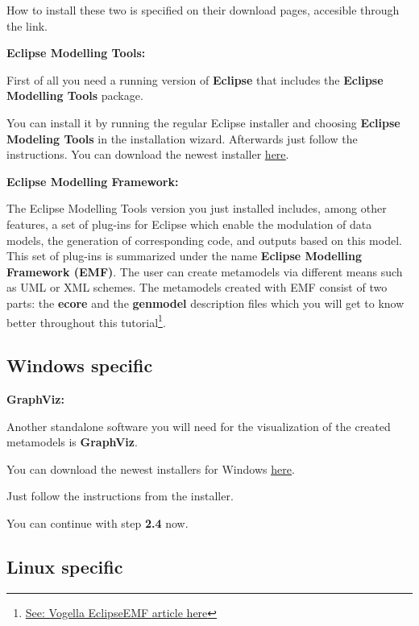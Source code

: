 How to install these two is specified on their download pages, accesible through the link.\newline

\textbf{Eclipse Modelling Tools:}

First of all you need a running version of \textbf{Eclipse} that includes the \textbf{Eclipse Modelling Tools} package.

You can install it by running the regular Eclipse installer and choosing \textbf{Eclipse Modeling Tools} in the installation wizard. Afterwards just follow the instructions.\newline
You can download the newest installer \underline{\href{https://www.eclipse.org/downloads/}{here}}.\newline

\textbf{Eclipse Modelling Framework:}

The Eclipse Modelling Tools version you just installed includes, among other features, a set of plug-ins for Eclipse which enable the modulation of data models, the generation of corresponding code, and outputs based on this model.\newline
This set of plug-ins is summarized under the name \textbf{Eclipse Modelling Framework (EMF)}.\newline
The user can create metamodels via different means such as UML or XML schemes. The metamodels created with EMF consist of two parts: the \textbf{ecore} and the \textbf{genmodel} description files which you will get to know better throughout this tutorial\footnote{\href{https://www.vogella.com/tutorials/EclipseEMF/article.html}{See: Vogella EclipseEMF article \underline{here}}}.

\subsection{Windows specific}

\textbf{GraphViz:}

Another standalone software you will need for the visualization of the created metamodels is \textbf{GraphViz}.

You can download the newest installers for Windows \href{https://graphviz.org/download/}{\underline{here}}.

Just follow the instructions from the installer.\newline

You can continue with step \textbf{2.4} now.
\subsection{Linux specific}

